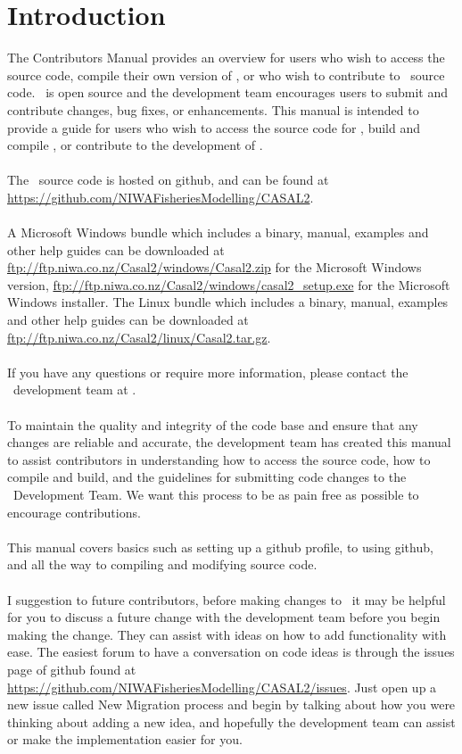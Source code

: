 \section{Introduction\label{sec:Introduction}}
The Contributors Manual provides an overview for users who wish to access the source code, compile their own version of \CNAME , or who wish to contribute to \CNAME\ source code. \CNAME\ is open source and the development team encourages users to submit and contribute changes, bug fixes, or enhancements. This manual is intended to provide a guide for users who wish to access the source code for \CNAME , build and compile  \CNAME , or contribute to the development of \CNAME . 
\\\\
The \CNAME\ source code is hosted on github, and can be found at \url{https://github.com/NIWAFisheriesModelling/CASAL2}.
\\\\
A Microsoft Windows bundle which includes a binary, manual, examples and other help guides can be downloaded at \url{ftp://ftp.niwa.co.nz/Casal2/windows/Casal2.zip} for the Microsoft Windows version, \url{ftp://ftp.niwa.co.nz/Casal2/windows/casal2_setup.exe} for the Microsoft Windows installer. The Linux bundle which includes a binary, manual, examples and other help guides can be downloaded at \url{ftp://ftp.niwa.co.nz/Casal2/linux/Casal2.tar.gz}.
\\\\
If you have any questions or require more information, please contact the \CNAME\ development team at \email.
\\\\
To maintain the quality and integrity of the code base and ensure that any changes are reliable and accurate, the development team has created this manual to assist contributors in understanding how to access the source code, how to compile and build, and the guidelines for submitting code changes to the \CNAME\ Development Team. We want this process to be as pain free as possible to encourage contributions. 
\\\\
This manual covers basics such as setting up a github profile, to using github, and all the way to compiling and modifying source code. 
\\\\
I suggestion to future contributors, before making changes to \CNAME\ it may be helpful for you to discuss a future change with the development team before you begin making the change. They can assist with ideas on how to add functionality with ease. The easiest forum to have a conversation on code ideas is through the issues page of github found at \url{https://github.com/NIWAFisheriesModelling/CASAL2/issues}. Just open up a new issue called New Migration process and begin by talking about how you were thinking about adding a new idea, and hopefully the development team can assist or make the implementation easier for you.
